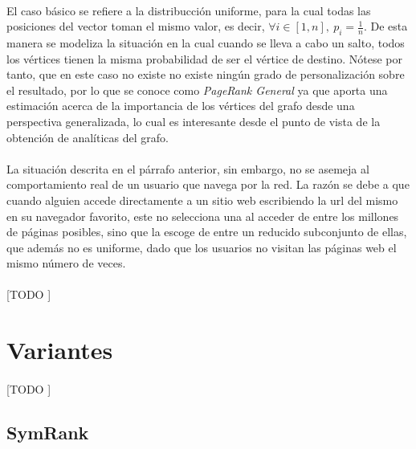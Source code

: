 \documentclass{subfiles}
\begin{document}
      \paragraph{}
      El caso básico se refiere a la distribucción uniforme, para la cual todas las posiciones del vector toman el mismo valor, es decir, $\forall i \in [1,n], \ p_i = \frac{1}{n}$. De esta manera se modeliza la situación en la cual cuando se lleva a cabo un salto, todos los vértices tienen la misma probabilidad de ser el vértice de destino. Nótese por tanto, que en este caso no existe no existe ningún grado de personalización sobre el resultado, por lo que se conoce como \emph{PageRank General} ya que aporta una estimación acerca de la importancia de los vértices del grafo desde una perspectiva generalizada, lo cual es interesante desde el punto de vista de la obtención de analíticas del grafo.

      \paragraph{}
      La situación descrita en el párrafo anterior, sin embargo, no se asemeja al comportamiento real de un usuario que navega por la red. La razón se debe a que cuando alguien accede directamente a un sitio web escribiendo la url del mismo en su navegador favorito, este no selecciona una al acceder de entre los millones de páginas posibles, sino que la escoge de entre un reducido subconjunto de ellas, que además no es uniforme, dado que los usuarios no visitan las páginas web el mismo número de veces.

      \paragraph{}
      [TODO ]

    \section{Variantes}
    \label{sec:pagerank_variants}

      \paragraph{}
      [TODO ]

      \subsection{SymRank}
      \label{sec:symrank}
\end{document}
